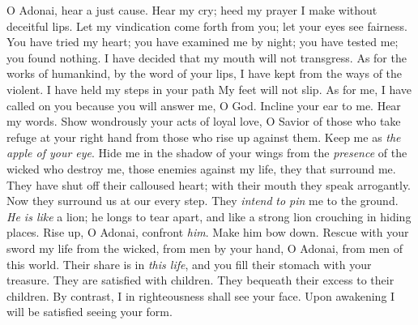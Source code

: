 \begin{biblechapter} %
 O Adonai, hear a just cause. 
Hear my cry; heed my prayer 
I make without deceitful lips.
\verse Let my vindication come forth from you; 
let your eyes see fairness.
\verse You have tried my heart; 
you have examined me by night; 
you have tested me; you found nothing. 
I have decided that my mouth will not transgress.
\verse As for the works of humankind, 
by the word of your lips, 
I have kept from the ways of the violent.
\verse I have held my steps in your path 
My feet will not slip.
\verse As for me, I have called on you 
because you will answer me, O God. 
Incline your ear to me. 
Hear my words.
\verse Show wondrously your acts of loyal love, 
O Savior of those who take refuge 
at your right hand 
from those who rise up against them.
\verse Keep me as \textit{the apple of your eye}. 
Hide me in the shadow of your wings
\verse from the \textit{presence} of the wicked who destroy me, 
those enemies against my life, 
they that surround me.
\verse They have shut off their calloused heart; 
with their mouth they speak arrogantly.
\verse Now they surround us at our every step. 
They \textit{intend} 
\textit{to pin} me to the ground.
\verse \textit{He is like} a lion; he longs to tear apart, 
and like a strong lion crouching in hiding places.
\verse Rise up, O Adonai, confront \textit{him}. 
Make him bow down. 
Rescue with your sword my life from the wicked,
\verse from men by your hand, O Adonai, from men of this world. 
Their share is in \textit{this life}, and you fill their stomach with your treasure. 
They are satisfied with children. 
They bequeath their excess to their children.
\verse By contrast, I in righteousness shall see your face. 
Upon awakening I will be satisfied seeing your form.
\end{biblechapter}


